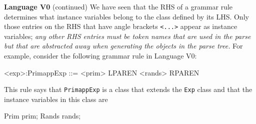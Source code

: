 \begin{minipage}[t]{\sw}
\slidenumber
\LARGE
{\bf Language V0} (continued)\exx
We have seen that
the RHS of a grammar rule determines
what instance variables belong to the class defined by its LHS.
Only those entries on the RHS that have angle brackets \verb'<...>'
appear as instance variables;
{\em any other RHS entries must be token names
that are used in the parse but that are abstracted away
when generating the objects in the parse tree.}\exx
For example, consider the following grammar rule in Language V0:
\begin{qv}
<exp>:PrimappExp ::= <prim> LPAREN <rands> RPAREN
\end{qv}
This rule says that \verb'PrimappExp' is a class
that extends the \verb'Exp' class
and that the instance variables in this class are
\begin{qv}
Prim prim;
Rands rands;
\end{qv}
\end{minipage}
\clearpage
